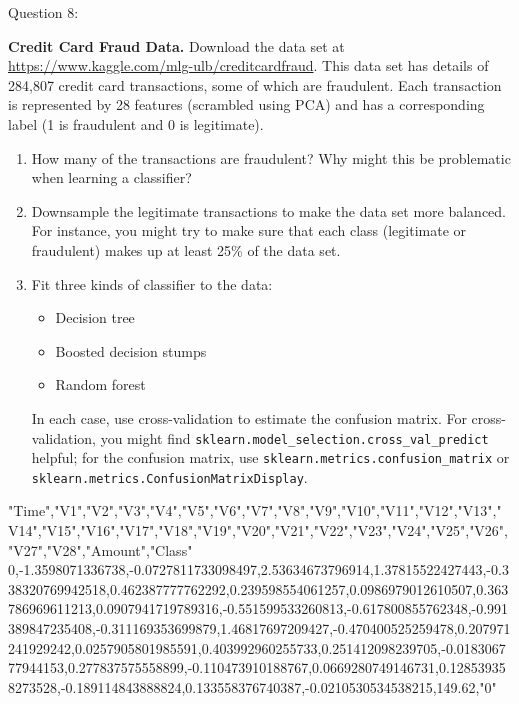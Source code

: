 Question 8:  \item \textbf{Credit Card Fraud Data.} Download the data set at \url{https://www.kaggle.com/mlg-ulb/creditcardfraud}. This data set has details of 284,807 credit card transactions, some of which are fraudulent. Each transaction is represented by 28 features (scrambled using PCA) and has a corresponding label (1 is fraudulent and 0 is legitimate).
\begin{enumerate}
  \item How many of the transactions are fraudulent? Why might this be problematic when learning a classifier?
  \item Downsample the legitimate transactions to make the data set more balanced. For instance, you might try to make sure that each class (legitimate or fraudulent) makes up at least 25\% of the data set.
  \item Fit three kinds of classifier to the data:
    \begin{itemize}
      \item Decision tree
      \item Boosted decision stumps
      \item Random forest
    \end{itemize}
  In each case, use cross-validation to estimate the confusion matrix. For cross-validation, you might find \texttt{sklearn.model\_selection.cross\_val\_predict} helpful; for the confusion matrix, use \texttt{sklearn.metrics.confusion\_matrix} or \texttt{sklearn.metrics.ConfusionMatrixDisplay}.
\end{enumerate} 


"Time","V1","V2","V3","V4","V5","V6","V7","V8","V9","V10","V11","V12","V13","V14","V15","V16","V17","V18","V19","V20","V21","V22","V23","V24","V25","V26","V27","V28","Amount","Class"
0,-1.3598071336738,-0.0727811733098497,2.53634673796914,1.37815522427443,-0.338320769942518,0.462387777762292,0.239598554061257,0.0986979012610507,0.363786969611213,0.0907941719789316,-0.551599533260813,-0.617800855762348,-0.991389847235408,-0.311169353699879,1.46817697209427,-0.470400525259478,0.207971241929242,0.0257905801985591,0.403992960255733,0.251412098239705,-0.018306777944153,0.277837575558899,-0.110473910188767,0.0669280749146731,0.128539358273528,-0.189114843888824,0.133558376740387,-0.0210530534538215,149.62,"0"


